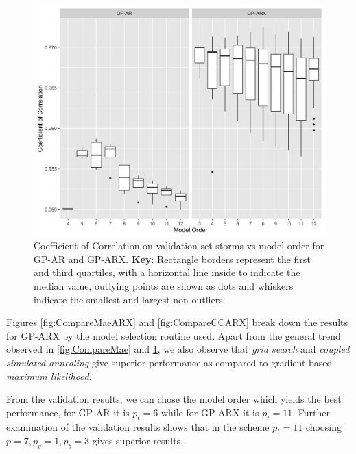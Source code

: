 \documentclass{article}
\begin{document}
\begin{figure}[h]
\includegraphics[width=\textwidth]{Compare-cc.png}
\caption{Coefficient of Correlation on validation set storms vs model order for GP-AR and GP-ARX. \textbf{Key}: Rectangle borders represent the first and third quartiles, with a horizontal line inside to indicate the median value, outlying points are shown as dots and whiskers indicate the smallest and largest non-outliers}
\label{fig:CompareCC}
\end{figure}


Figures \ref{fig:CompareMaeARX} and \ref{fig:CompareCCARX} break down the results for GP-ARX by the model selection routine used. Apart from the general trend observed in \ref{fig:CompareMae} and \ref{fig:CompareCC}, we also observe that \emph{grid search} and \emph{coupled simulated annealing} give superior performance as compared to gradient based \emph{maximum likelihood}.

From the validation results, we can chose the model order which yields the best performance, for GP-AR it is $p_t = 6$ while for GP-ARX it is $p_t = 11$. Further examination of the validation results shows that in the scheme $p_t = 11$ choosing $p = 7, p_v = 1, p_b = 3$ gives superior results.
\end{document}
